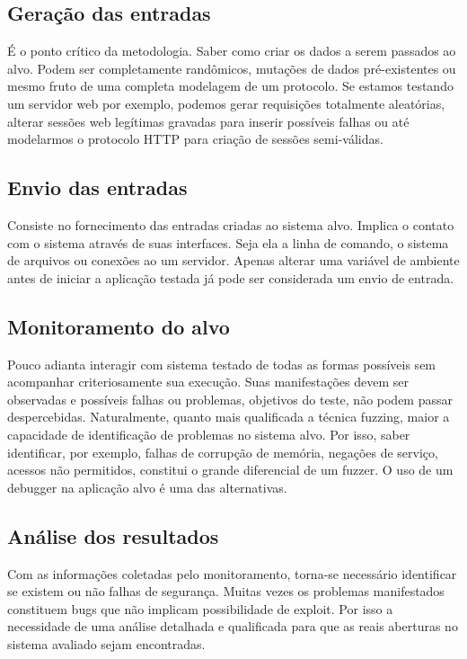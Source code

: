 		\subsection{Geração das entradas}
			É o ponto crítico da metodologia. Saber como criar os dados a serem passados ao alvo.
			Podem ser completamente randômicos, mutações de dados pré-existentes ou mesmo fruto de
			uma completa modelagem de um protocolo. Se estamos testando um servidor web por exemplo, podemos
			gerar requisições totalmente aleatórias, alterar sessões web legítimas gravadas para inserir
			possíveis falhas ou até modelarmos o protocolo HTTP para criação de sessões semi-válidas.
		\subsection{Envio das entradas}
			Consiste no fornecimento das entradas criadas ao sistema alvo.
			Implica o contato com o sistema através de suas interfaces.
			Seja ela a linha de comando, o sistema de arquivos ou conexões ao um servidor.
			Apenas alterar uma variável de ambiente antes de iniciar a aplicação testada
			já pode ser considerada um envio de entrada.
		\subsection{Monitoramento do alvo}
			Pouco adianta interagir com sistema testado de todas as formas possíveis sem acompanhar
			criteriosamente sua execução. Suas manifestações devem ser observadas e possíveis
			falhas ou problemas, objetivos do teste, não podem passar despercebidas.
			Naturalmente, quanto mais qualificada a técnica fuzzing, maior a capacidade de
			identificação de problemas no sistema alvo.
			Por isso, saber identificar, por exemplo, falhas de corrupção de memória, 
			negações de serviço, acessos não permitidos, constitui o grande diferencial de um fuzzer.
			O uso de um debugger na aplicação alvo é uma das alternativas.
		\subsection{Análise dos resultados}
			Com as informações coletadas pelo monitoramento, torna-se necessário
			identificar se existem ou não falhas de segurança.
			Muitas vezes os problemas manifestados constituem bugs que não implicam
			possibilidade de exploit.
			Por isso a necessidade de uma análise detalhada e qualificada para que
			as reais aberturas no sistema avaliado sejam encontradas. 	
		

